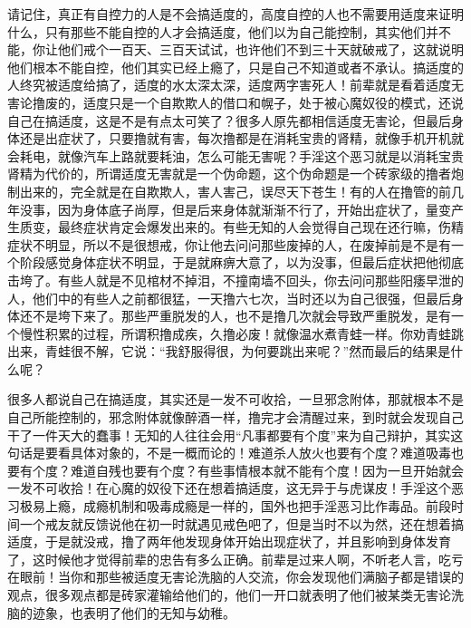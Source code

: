 请记住，真正有自控力的人是不会搞适度的，高度自控的人也不需要用适度来证明什么，只有那些不能自控的人才会搞适度，他们以为自己能控制，其实他们并不能，你让他们戒个一百天、三百天试试，也许他们不到三十天就破戒了，这就说明他们根本不能自控，他们其实已经上瘾了，只是自己不知道或者不承认。搞适度的人终究被适度给搞了，适度的水太深太深，适度两字害死人！前辈就是看着适度无害论撸废的，适度只是一个自欺欺人的借口和幌子，处于被心魔奴役的模式，还说自己在搞适度，这是不是有点太可笑了？很多人原先都相信适度无害论，但最后身体还是出症状了，只要撸就有害，每次撸都是在消耗宝贵的肾精，就像手机开机就会耗电，就像汽车上路就要耗油，怎么可能无害呢？手淫这个恶习就是以消耗宝贵肾精为代价的，所谓适度无害就是一个伪命题，这个伪命题是一个砖家级的撸者炮制出来的，完全就是在自欺欺人，害人害己，误尽天下苍生！有的人在撸管的前几年没事，因为身体底子尚厚，但是后来身体就渐渐不行了，开始出症状了，量变产生质变，最终症状肯定会爆发出来的。有些无知的人会觉得自己现在还行嘛，伤精症状不明显，所以不是很想戒，你让他去问问那些废掉的人，在废掉前是不是有一个阶段感觉身体症状不明显，于是就麻痹大意了，以为没事，但最后症状把他彻底击垮了。有些人就是不见棺材不掉泪，不撞南墙不回头，你去问问那些阳痿早泄的人，他们中的有些人之前都很猛，一天撸六七次，当时还以为自己很强，但最后身体还不是垮下来了。那些严重脱发的人，也不是撸几次就会导致严重脱发，是有一个慢性积累的过程，所谓积撸成疾，久撸必废！就像温水煮青蛙一样。你劝青蛙跳出来，青蛙很不解，它说：“我舒服得很，为何要跳出来呢？”然而最后的结果是什么呢？

很多人都说自己在搞适度，其实还是一发不可收拾，一旦邪念附体，那就根本不是自己所能控制的，邪念附体就像醉酒一样，撸完才会清醒过来，到时就会发现自己干了一件天大的蠢事！无知的人往往会用“凡事都要有个度”来为自己辩护，其实这句话是要看具体对象的，不是一概而论的！难道杀人放火也要有个度？难道吸毒也要有个度？难道自残也要有个度？有些事情根本就不能有个度！因为一旦开始就会一发不可收拾！在心魔的奴役下还在想着搞适度，这无异于与虎谋皮！手淫这个恶习极易上瘾，成瘾机制和吸毒成瘾是一样的，国外也把手淫恶习比作毒品。前段时间一个戒友就反馈说他在初一时就遇见戒色吧了，但是当时不以为然，还在想着搞适度，于是就没戒，撸了两年他发现身体开始出现症状了，并且影响到身体发育了，这时候他才觉得前辈的忠告有多么正确。前辈是过来人啊，不听老人言，吃亏在眼前！当你和那些被适度无害论洗脑的人交流，你会发现他们满脑子都是错误的观点，很多观点都是砖家灌输给他们的，他们一开口就表明了他们被某类无害论洗脑的迹象，也表明了他们的无知与幼稚。

